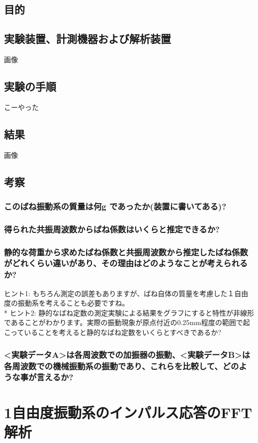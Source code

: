 \documentclass{jsarticle}
\begin{document}
\subsection{目的}
\subsection{実験装置、計測機器および解析装置}
画像
\subsection{実験の手順}
こーやった
\subsection{結果}
画像
\subsection{考察}
\subsubsection{このばね振動系の質量は何g であったか(装置に書いてある)?}
\subsubsection{得られた共振周波数からばね係数はいくらと推定できるか? }
\subsubsection{静的な荷重から求めたばね係数と共振周波数から推定したばね係数がどれくらい違いがあり、その理由はどのようなことが考えられるか? }\noindent
ヒント1: もちろん測定の誤差もありますが、ばね自体の質量を考慮した１自由度の振動系を考えることも必要ですね。\\*
ヒント2: 静的なばね定数の測定実験による結果をグラフにすると特性が非線形であることがわかります。実際の振動現象が原点付近の0.25mm程度の範囲で起こっていることを考えると静的なばね定数をいくらとすべきであるか?
\subsubsection{<実験データA>は各周波数での加振器の振動、<実験データB>は各周波数での機械振動系の振動であり、これらを比較して、どのような事が言えるか?}

\section{1自由度振動系のインパルス応答のFFT 解析}
\end{document}
